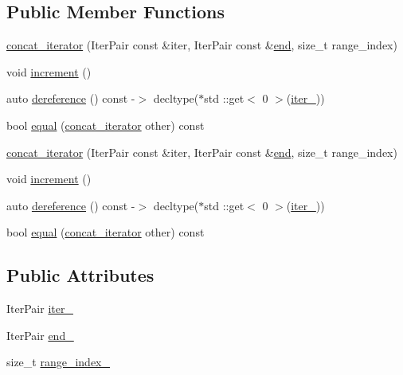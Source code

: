 \subsection*{Public Member Functions}
\begin{DoxyCompactItemize}
\item 
\mbox{\hyperlink{structrah_1_1view_1_1concat__iterator_a45e7ea9b72e7df5390a2ae09a6923d11}{concat\+\_\+iterator}} (Iter\+Pair const \&iter, Iter\+Pair const \&\mbox{\hyperlink{namespacerah_a20a3e45aee90bb5534a00c6b14e06069}{end}}, size\+\_\+t range\+\_\+index)
\item 
void \mbox{\hyperlink{structrah_1_1view_1_1concat__iterator_a6301909457da06a9894f4681353442b4}{increment}} ()
\item 
auto \mbox{\hyperlink{structrah_1_1view_1_1concat__iterator_a8449f70baf374fb27f6cf7dbb80e2d17}{dereference}} () const -\/$>$ decltype($\ast$std \+::get$<$ 0 $>$(\mbox{\hyperlink{structrah_1_1view_1_1concat__iterator_affb17b45b66a04b01962c8b84dc20c43}{iter\+\_\+}}))
\item 
bool \mbox{\hyperlink{structrah_1_1view_1_1concat__iterator_a6e8021ecde205f2ceba2c167a6954d05}{equal}} (\mbox{\hyperlink{structrah_1_1view_1_1concat__iterator}{concat\+\_\+iterator}} other) const
\item 
\mbox{\hyperlink{structrah_1_1view_1_1concat__iterator_a45e7ea9b72e7df5390a2ae09a6923d11}{concat\+\_\+iterator}} (Iter\+Pair const \&iter, Iter\+Pair const \&\mbox{\hyperlink{namespacerah_a20a3e45aee90bb5534a00c6b14e06069}{end}}, size\+\_\+t range\+\_\+index)
\item 
void \mbox{\hyperlink{structrah_1_1view_1_1concat__iterator_a6301909457da06a9894f4681353442b4}{increment}} ()
\item 
auto \mbox{\hyperlink{structrah_1_1view_1_1concat__iterator_a8449f70baf374fb27f6cf7dbb80e2d17}{dereference}} () const -\/$>$ decltype($\ast$std \+::get$<$ 0 $>$(\mbox{\hyperlink{structrah_1_1view_1_1concat__iterator_affb17b45b66a04b01962c8b84dc20c43}{iter\+\_\+}}))
\item 
bool \mbox{\hyperlink{structrah_1_1view_1_1concat__iterator_a6e8021ecde205f2ceba2c167a6954d05}{equal}} (\mbox{\hyperlink{structrah_1_1view_1_1concat__iterator}{concat\+\_\+iterator}} other) const
\end{DoxyCompactItemize}
\subsection*{Public Attributes}
\begin{DoxyCompactItemize}
\item 
Iter\+Pair \mbox{\hyperlink{structrah_1_1view_1_1concat__iterator_affb17b45b66a04b01962c8b84dc20c43}{iter\+\_\+}}
\item 
Iter\+Pair \mbox{\hyperlink{structrah_1_1view_1_1concat__iterator_a98e3cb2e64c68c2a5dd34da03293acea}{end\+\_\+}}
\item 
size\+\_\+t \mbox{\hyperlink{structrah_1_1view_1_1concat__iterator_af57a6e3b1baf3641831378c7919e4256}{range\+\_\+index\+\_\+}}
\end{DoxyCompactItemize}


